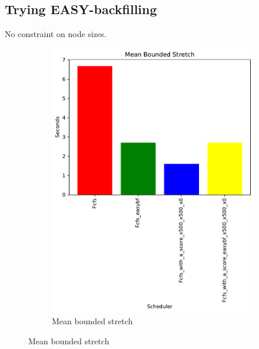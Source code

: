 \documentclass[a4paper]{article}
\begin{document}
\subsection{Trying EASY-backfilling}

No constraint on node sizes.

\begin{figure}[H]\centering
\begin{subfigure}[b]{0.4\linewidth}\centering\includegraphics[width=1\linewidth]{MBSS/plot/Backfill_2022-01-24->2022-01-24_Mean_Stretch_With_a_Minimum_450_128_32_256_4_1024.pdf}\caption{Mean bounded stretch}\label{4}\end{subfigure}

\end{figure}
\end{document}
